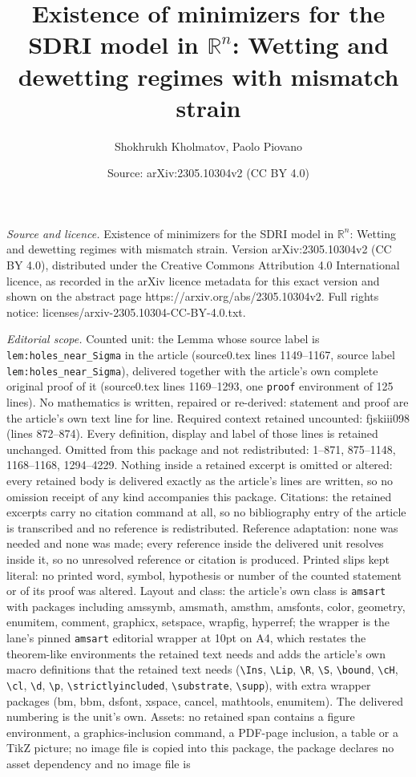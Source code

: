 \documentclass[10pt,a4paper]{amsart}
\title[Existence of minimizers for the SDRI model in $\mathbb{R}^n$]{Existence of minimizers for the SDRI model in $\mathbb{R}^n$: Wetting and dewetting regimes with mismatch strain}
\author{Shokhrukh Kholmatov, Paolo Piovano}
\date{Source: arXiv:2305.10304v2 (CC BY 4.0)}
\begin{document}
\maketitle

\noindent\emph{Source and licence.} Existence of minimizers for the SDRI model in $\mathbb{R}^n$: Wetting and dewetting regimes with mismatch strain. Version arXiv:2305.10304v2 (CC BY 4.0), distributed under the Creative Commons Attribution 4.0 International licence, as recorded in the arXiv licence metadata for this exact version and shown on the abstract page https://arxiv.org/abs/2305.10304v2. Full rights notice: licenses/arxiv-2305.10304-CC-BY-4.0.txt.\par\smallskip

\noindent\textit{Editorial scope.} Counted unit: the Lemma whose source label is \texttt{lem:holes\_near\_Sigma} in the article (source0.tex lines 1149--1167, source label \texttt{lem:holes\_near\_Sigma}), delivered together with the article's own complete original proof of it (source0.tex lines 1169--1293, one \texttt{proof} environment of 125 lines). No mathematics is written, repaired or re-derived: statement and proof are the article's own text line for line. Required context retained uncounted: fjskiii098 (lines 872--874). Every definition, display and label of those lines is retained unchanged. Omitted from this package and not redistributed: 1--871, 875--1148, 1168--1168, 1294--4229. Nothing inside a retained excerpt is omitted or altered: every retained body is delivered exactly as the article's lines are written, so no omission receipt of any kind accompanies this package. Citations: the retained excerpts carry no citation command at all, so no bibliography entry of the article is transcribed and no reference is redistributed. Reference adaptation: none was needed and none was made; every reference inside the delivered unit resolves inside it, so no unresolved reference or citation is produced. Printed slips kept literal: no printed word, symbol, hypothesis or number of the counted statement or of its proof was altered. Layout and class: the article's own class is \texttt{amsart} with packages including amssymb, amsmath, amsthm, amsfonts, color, geometry, enumitem, comment, graphicx, setspace, wrapfig, hyperref; the wrapper is the lane's pinned \texttt{amsart} editorial wrapper at 10pt on A4, which restates the theorem-like environments the retained text needs and adds the article's own macro definitions that the retained text needs (\texttt{\textbackslash Ins}, \texttt{\textbackslash Lip}, \texttt{\textbackslash R}, \texttt{\textbackslash S}, \texttt{\textbackslash bound}, \texttt{\textbackslash cH}, \texttt{\textbackslash cl}, \texttt{\textbackslash d}, \texttt{\textbackslash p}, \texttt{\textbackslash strictlyincluded}, \texttt{\textbackslash substrate}, \texttt{\textbackslash supp}), with extra wrapper packages (bm, bbm, dsfont, xspace, cancel, mathtools, enumitem). The delivered numbering is the unit's own. Assets: no retained span contains a figure environment, a graphics-inclusion command, a PDF-page inclusion, a table or a TikZ picture; no image file is copied into this package, the package declares no asset dependency and no image file is 
\end{document}
